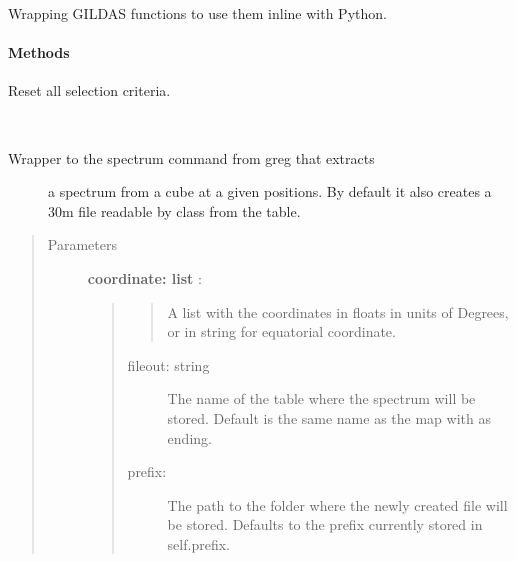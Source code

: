 \documentclass[a4paper,10pt,english]{sphinxmanual}
\begin{document}
\begin{fulllineitems}
\label{maps:astrolyze.maps.gildas.GildasMap}
Wrapping GILDAS functions to use them inline with Python.
\paragraph{Methods}

\begin{fulllineitems}
\label{maps:astrolyze.maps.gildas.GildasMap.set_defaults}
Reset all selection criteria.

\end{fulllineitems}


\begin{fulllineitems}
\label{maps:astrolyze.maps.gildas.GildasMap.spectrum}~\begin{description}
\item[{Wrapper to the spectrum command from greg that extracts}] \leavevmode
a spectrum from a cube at a given positions. By default it also creates
a 30m file readable by class from the table.

\end{description}
\begin{quote}\begin{description}
\item[{Parameters }] \leavevmode
\textbf{coordinate: list} :
\begin{quote}
\begin{quote}

A list with the coordinates in floats in units of Degrees,
or in string for equatorial coordinate.
\end{quote}
\begin{description}
\item[{fileout: string}] \leavevmode
The name of the table where the spectrum will be stored.
Default is the same name as the map with  as ending.

\item[{prefix:}] \leavevmode
The path to the folder where the newly created file will be
stored.  Defaults to the prefix currently stored in self.prefix.


\end{description}
\end{quote}
\end{description}
\end{quote}
\end{fulllineitems}
\end{fulllineitems}
\end{document}
